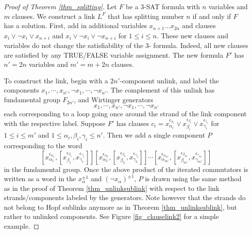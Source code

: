\documentclass[12pt]{amsart}
\theoremstyle{definition}
\theoremstyle{remark}
\begin{document}
\begin{proof}[Proof of Theorem \ref{thm_splitting}]

Let $F$ be a 3-\textsc{SAT} formula with $n$ variables and $m$ clauses.  We construct a link $L^F$ that has splitting number $n$ if and only if $F$ has a solution.  First, add in additional variables $x_{n+1} \dots x_{2n}$ and clauses $x_i \vee \neg x_i \vee x_{n+i}$ and $x_i \vee \neg x_i \vee \neg x_{n+i}$ for $1 \le i \le n$.  These new clauses and variables do not change the satisfiability of the 3- formula.  Indeed, all new clauses are satisfied by any TRUE/FALSE variable assignment. The new formula $F'$ has $n' = 2n$ variables and $m' = m+2n$ clauses.

To construct the link, begin with a $2n'$-component unlink, and label the components $x_1, \cdots, x_{n'}, \neg x_1, \cdots , \neg x_{n'}$.  The complement of this unlink has fundamental group $F_{2n'}$, and Wirtinger generators $$x_1, \cdots, x_{n'}, \neg x_1, \cdots , \neg x_{n'}$$ each corresponding to a loop going once around the strand of the link component with the respective label.  Suppose $F'$ has clauses $c_i =  x_{\alpha_i}^{\epsilon_{\alpha_i}} \vee x_{\beta_i}^{\epsilon_{\beta_i}} \vee x_{\gamma_i}^{\epsilon_{\gamma_i}}$ for $1 \le i \le m'$ and $1 \le \alpha_i,\beta_i,\gamma_i \le n'$.  Then we add a single component $P$ corresponding to the word
$$[x_{\alpha_1}^{\epsilon_{\alpha_1}}, [ x_{\beta_1}^{\epsilon_{\beta_1}}, x_{\gamma_1}^{\epsilon_{\gamma_1}}]][x_{\alpha_2}^{\epsilon_{\alpha_2}}, [ x_{\beta_2}^{\epsilon_{\beta_2}}, x_{\gamma_2}^{\epsilon_{\gamma_2}}]] \cdots [x_{\alpha_{m'}}^{\epsilon_{\alpha_{m'}}}, [ x_{\beta_{m'}}^{\epsilon_{\beta_{m'}}}, x_{\gamma_{m'}}^{\epsilon_{\gamma_{m'}}}]]$$
in the fundamental group. Once the above product of the iterated commutators is written as a word in the $x_\alpha^{\pm 1}$ and $(\neg x_\alpha)^{\pm 1}$, $P$ is drawn using the same method as in the proof of Theorem \ref{thm_unlinksublink} with respect to the link strands/components labeled by the generators. Note however that the strands do not belong to Hopf sublinks anymore as in Theorem \ref{thm_unlinksublink}, but rather to unlinked components. See Figure \ref{fig_clauselink2} for a simple example.


\end{proof}
\end{document}
